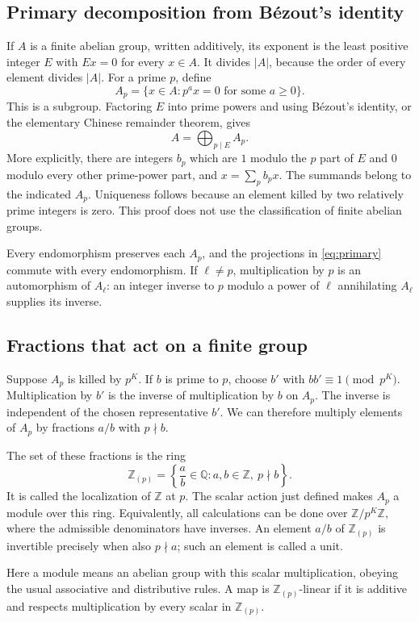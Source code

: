 \documentclass[11pt]{article}
\numberwithin{equation}{section}
\theoremstyle{definition}
\theoremstyle{remark}
\newcommand{\Z}{\mathbb Z}
\newcommand{\Q}{\mathbb Q}
\newcommand{\Rloc}{\mathbb Z_{(p)}}
\begin{document}
\subsection{Primary decomposition from B\'ezout's identity}
If $A$ is a finite abelian group, written additively, its exponent is the least positive integer $E$ with $Ex=0$ for every $x\in A$. It divides $|A|$, because the order of every element divides $|A|$. For a prime $p$, define
\[
A_p=\{x\in A:p^a x=0\text{ for some }a\ge0\}.
\]
This is a subgroup. Factoring $E$ into prime powers and using B\'ezout's identity, or the elementary Chinese remainder theorem, gives
\begin{equation}\label{eq:primary}
A=\bigoplus_{p\mid E}A_p.
\end{equation}
More explicitly, there are integers $b_p$ which are $1$ modulo the $p$ part of $E$ and $0$ modulo every other prime-power part, and $x=\sum_p b_px$. The summands belong to the indicated $A_p$. Uniqueness follows because an element killed by two relatively prime integers is zero. This proof does not use the classification of finite abelian groups.

Every endomorphism preserves each $A_p$, and the projections in \eqref{eq:primary} commute with every endomorphism. If $\ell\ne p$, multiplication by $p$ is an automorphism of $A_\ell$: an integer inverse to $p$ modulo a power of $\ell$ annihilating $A_\ell$ supplies its inverse.

\subsection{Fractions that act on a finite group}
Suppose $A_p$ is killed by $p^K$. If $b$ is prime to $p$, choose $b'$ with $bb'\equiv1\pmod{p^K}$. Multiplication by $b'$ is the inverse of multiplication by $b$ on $A_p$. The inverse is independent of the chosen representative $b'$. We can therefore multiply elements of $A_p$ by fractions $a/b$ with $p\nmid b$.

The set of these fractions is the ring
\[
\Rloc=\left\{\frac ab\in\Q:a,b\in\Z,\ p\nmid b\right\}.
\]
It is called the localization of $\Z$ at $p$. The scalar action just defined makes $A_p$ a module over this ring. Equivalently, all calculations can be done over $\Z/p^K\Z$, where the admissible denominators have inverses. An element $a/b$ of $\Rloc$ is invertible precisely when also $p\nmid a$; such an element is called a unit.

Here a module means an abelian group with this scalar multiplication, obeying the usual associative and distributive rules. A map is $\Rloc$-linear if it is additive and respects multiplication by every scalar in $\Rloc$.
\end{document}
